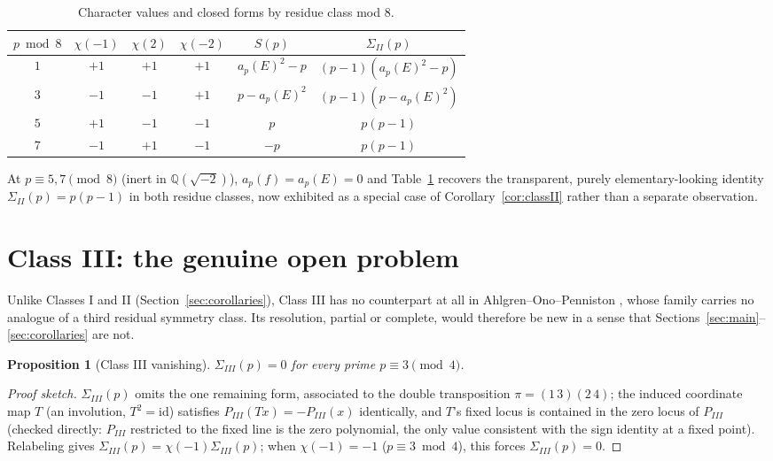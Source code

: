 \documentclass[11pt]{amsart}
\newtheorem{proposition}[theorem]{Proposition}
\theoremstyle{definition}
\newcommand{\Q}{\mathbb{Q}}
\begin{document}
\begin{table}[h]
\centering
\caption{Character values and closed forms by residue class mod $8$.}
\label{tab:mod8}
\begin{tabular}{c|ccc|cc}
$p\bmod 8$ & $\chi(-1)$ & $\chi(2)$ & $\chi(-2)$ & $S(p)$ & $\Sigma_{II}(p)$ \\\hline
$1$ & $+1$ & $+1$ & $+1$ & $a_p(E)^2-p$ & $(p-1)(a_p(E)^2-p)$ \\
$3$ & $-1$ & $-1$ & $+1$ & $p-a_p(E)^2$ & $(p-1)(p-a_p(E)^2)$ \\
$5$ & $+1$ & $-1$ & $-1$ & $p$ & $p(p-1)$ \\
$7$ & $-1$ & $+1$ & $-1$ & $-p$ & $p(p-1)$
\end{tabular}
\end{table}

At $p\equiv5,7\pmod8$ (inert in $\Q(\sqrt{-2})$), $a_p(f)=a_p(E)=0$ and Table~\ref{tab:mod8} recovers the transparent, purely elementary-looking identity $\Sigma_{II}(p)=p(p-1)$ in both residue classes, now exhibited as a special case of Corollary~\ref{cor:classII} rather than a separate observation.

\section{Class III: the genuine open problem}
\label{sec:classIII}

Unlike Classes I and II (Section~\ref{sec:corollaries}), Class III has no
counterpart at all in Ahlgren--Ono--Penniston \cite{AOP2002}, whose
family carries no analogue of a third residual symmetry class. Its
resolution, partial or complete, would therefore be new in a sense that
Sections~\ref{sec:main}--\ref{sec:corollaries} are not.

\begin{proposition}[Class III vanishing]
\label{prop:classIII}
$\Sigma_{III}(p)=0$ for every prime $p\equiv3\pmod4$.
\end{proposition}

\begin{proof}[Proof sketch]
$\Sigma_{III}(p)$ omits the one remaining form, associated to the double transposition $\pi=(1\,3)(2\,4)$; the induced coordinate map $T$ (an involution, $T^2=\mathrm{id}$) satisfies $P_{III}(Tx)=-P_{III}(x)$ identically, and $T$'s fixed locus is contained in the zero locus of $P_{III}$ (checked directly: $P_{III}$ restricted to the fixed line is the zero polynomial, the only value consistent with the sign identity at a fixed point). Relabeling gives $\Sigma_{III}(p)=\chi(-1)\Sigma_{III}(p)$; when $\chi(-1)=-1$ ($p\equiv3\bmod4$), this forces $\Sigma_{III}(p)=0$.
\end{proof}
\end{document}
